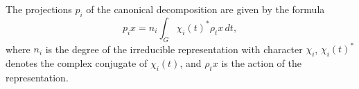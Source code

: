 The projections $p_i$ of the canonical decomposition are given by the formula
\[
p_i x = n_i \int_G \chi_i(t)^* \rho_t x \, dt,
\]
where $n_i$ is the degree of the irreducible representation with character $\chi_i$, $\chi_i(t)^*$ denotes the complex conjugate of $\chi_i(t)$, and $\rho_t x$ is the action of the representation.
